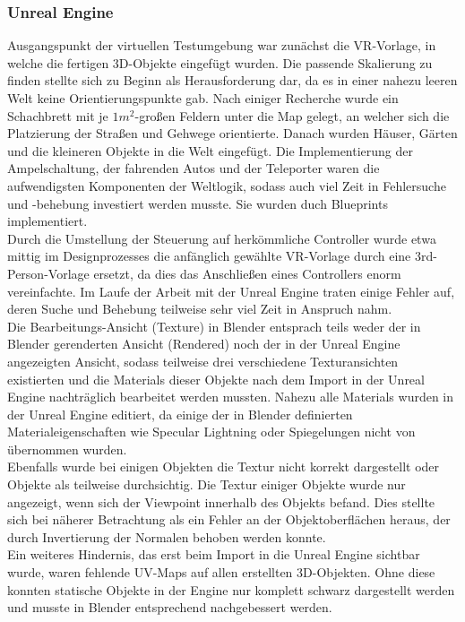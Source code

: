 \documentclass{Bericht}
\begin{document}
\subsubsection{Unreal Engine}
Ausgangspunkt der virtuellen Testumgebung war zunächst die VR-Vorlage, in welche die fertigen 3D-Objekte eingefügt wurden. Die passende Skalierung zu finden stellte sich zu Beginn als Herausforderung dar, da es in einer nahezu leeren Welt keine Orientierungspunkte gab. Nach einiger Recherche wurde ein Schachbrett mit je $1m^{2}$-großen Feldern unter die Map gelegt, an welcher sich die Platzierung der Straßen und Gehwege orientierte. Danach wurden Häuser, Gärten und die kleineren Objekte in die Welt eingefügt.
Die Implementierung der Ampelschaltung, der fahrenden Autos und der Teleporter waren die aufwendigsten Komponenten der Weltlogik, sodass auch viel Zeit in Fehlersuche und -behebung investiert werden musste. Sie wurden duch Blueprints implementiert.\\
		Durch die Umstellung der Steuerung auf herkömmliche Controller wurde etwa mittig im Designprozesses die anfänglich gewählte VR-Vorlage durch eine 3rd-Person-Vorlage ersetzt, da dies das Anschließen eines Controllers enorm vereinfachte.
		Im Laufe der Arbeit mit der Unreal Engine traten einige Fehler auf, deren Suche und Behebung teilweise sehr viel Zeit in Anspruch nahm.\\
Die Bearbeitungs-Ansicht (Texture) in Blender entsprach teils weder der in Blender gerenderten Ansicht (Rendered) noch der in der Unreal Engine angezeigten Ansicht, sodass teilweise drei verschiedene Texturansichten existierten und die Materials dieser Objekte nach dem Import in der Unreal Engine nachträglich bearbeitet werden mussten. Nahezu alle Materials wurden in der Unreal Engine editiert, da einige der in Blender definierten Materialeigenschaften wie Specular Lightning oder Spiegelungen nicht von übernommen wurden.\\
Ebenfalls wurde bei einigen Objekten die Textur nicht korrekt dargestellt oder Objekte als teilweise durchsichtig. 
Die Textur einiger Objekte wurde nur angezeigt, wenn sich der Viewpoint innerhalb des Objekts befand. Dies stellte sich bei näherer Betrachtung als ein Fehler an der Objektoberflächen heraus, der durch Invertierung der Normalen behoben werden konnte.\\
Ein weiteres Hindernis, das erst beim Import in die Unreal Engine sichtbar wurde, waren fehlende UV-Maps auf allen erstellten 3D-Objekten. Ohne diese konnten statische Objekte in der Engine nur komplett schwarz dargestellt werden und musste in Blender entsprechend nachgebessert werden. 
\end{document}
